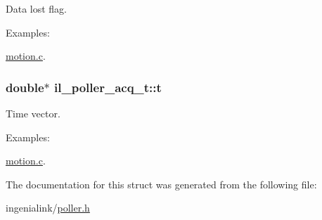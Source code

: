 Data lost flag. 

\begin{Desc}
\item[Examples\+: ]\par
\hyperlink{motion_8c-example}{motion.\+c}.\end{Desc}
\subsubsection[{\texorpdfstring{t}{t}}]{\setlength{\rightskip}{0pt plus 5cm}double$\ast$ il\+\_\+poller\+\_\+acq\+\_\+t\+::t}\hypertarget{structil__poller__acq__t_aae27ff232752eb21937cefd31c5adcb4}{}\label{structil__poller__acq__t_aae27ff232752eb21937cefd31c5adcb4}


Time vector. 

\begin{Desc}
\item[Examples\+: ]\par
\hyperlink{motion_8c-example}{motion.\+c}.\end{Desc}


The documentation for this struct was generated from the following file\+:\begin{DoxyCompactItemize}
\item 
ingenialink/\hyperlink{poller_8h}{poller.\+h}\end{DoxyCompactItemize}
